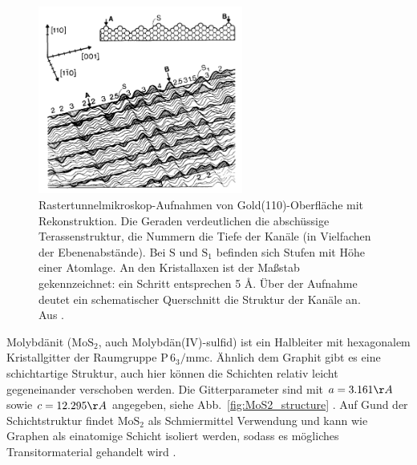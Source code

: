 \begin{figure}
    \includegraphics[width=0.6\textwidth]{pics/Au(110)_channels}
    \caption{Rastertunnelmikroskop-Aufnahmen von Gold(110)-Oberfläche mit 
Rekonstruktion. Die Geraden verdeutlichen die abschüssige Terassenstruktur, die 
Nummern die Tiefe der Kanäle (in Vielfachen der Ebenenabstände). Bei $\mathrm{S}$
und $\mathrm{S_1}$ befinden sich Stufen mit Höhe einer Atomlage. An den Kristallaxen 
ist der Maßstab gekennzeichnet: ein Schritt entsprechen 5 \AA. Über der Aufnahme 
deutet ein schematischer Querschnitt die Struktur der Kanäle an. 
Aus \cite{binnig1983111}.}
    \label{fig:Ag(100)}
\end{figure} 

Molybdänit ($\mathrm{MoS_2}$, auch Molybdän(IV)-sulfid) ist ein Halbleiter mit 
hexagonalem Kristallgitter der Raumgruppe $\mathrm{P \, 6_3/mmc}$. Ähnlich 
dem Graphit gibt es eine schichtartige Struktur, auch hier können die Schichten 
relativ leicht gegeneinander verschoben werden. Die Gitterparameter sind mit 
$a = 3.161 \AA$ sowie $c = 12.295 \AA$ angegeben, siehe
Abb.~\ref{fig:MoS2_structure} \cite{schrocke1981mineralogie}. 
Auf Gund der Schichtstruktur findet $\mathrm{MoS_2}$ als 
Schmiermittel Verwendung und kann wie Graphen als einatomige Schicht isoliert 
werden, sodass es mögliches Transitormaterial gehandelt wird 
\cite{mak2010atomically}. 

